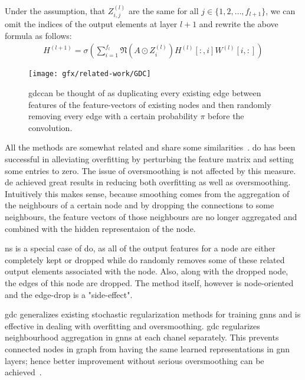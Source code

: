 Under the assumption, that $Z_{i,j}^{(l)}$ are the same for all $j \in \{1,2,\dots, f_{l+1}\}$,
we can omit the indices of the output elements at layer $l+1$ and rewrite the above formula as follows:
\begin{align*}
    H^{(l+1)} = \sigma(\sum_{i= 1}^{f_{l}}\mathfrak{N}(A \odot Z_{i}^{(l)})H^{(l)}[:,i] W^{(l)}[i,:])
\end{align*}
\begin{figure}[H]
    \centering
    \texttt{[image: gfx/related-work/GDC]}
    \caption{\acf{gdc}can be thought of as duplicating every existing edge between features of the feature-vectors of existing nodes and then randomly removing every edge with a certain probability $\pi$ before the convolution.}\label{fig:related:GraphDropConnect}
\end{figure}

All the methods are somewhat related and share some similarities~\cite{Rong2020}. \acf{do} has been successful in alleviating overfitting by perturbing the feature matrix and setting some entries to zero. The issue of oversmoothing is not affected by this measure.
\acf{de} achieved great results in reducing both overfitting as well as oversmoothing. Intuitively this makes sense, because smoothing comes from the aggregation of the neighbours of a certain node and by dropping the connections to some neighbours, the feature vectors of those neighbours are no longer aggregated and combined with the hidden representaion of the node.

\acf{ns} is a special case of \acf{do}, as all of the output features for a node are either completely kept or dropped while \ac{do} randomly removes some of these related output elements associated with the node. Also, along with the dropped node, the edges of this node are dropped. The method itself, however is node-oriented and the edge-drop is a "side-effect".

\acf{gdc} generalizes existing stochastic regularization methods for training \acp{gnn} and is effective in dealing with overfitting and oversmoothing.
\ac{gdc} regularizes neighbourhood aggregation in \acp{gnn} at each chanel separately. This prevents connected nodes in graph from having the same learned representations in \ac{gnn} layers; hence better improvement without serious oversmoothing can be achieved~\cite{Hasanzadeh2020}.
